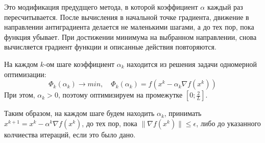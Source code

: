\documentclass[12pt]{article}
\begin{document}
Это модификация предудщего метода, в которой коэффициент $\alpha$ каждый раз пересчитывается. После вычисления в начальной точке градиента, движение в направлении антиградиента делается не маленькими шагами, а до тех пор, пока функция убывает. При достижении минимума на выбранном направлении, снова вычисляется градиент функции и описанные действия повторяются.

На каждом $k$-ом шаге коэффициент $\alpha_k$ находится из решения задачи одномерной оптимизации:
\[ \Phi_k (\alpha_k) \rightarrow min, \quad  \Phi_k (\alpha_k) = f(x^k - \alpha_k \nabla f(x^k)) \]
При этом, $\alpha_k > 0$, поэтому оптимизируем на промежутке $\left[ 0; \frac{2}{L} \right]$.

Таким образом, на каждом шаге будем находить $\alpha_k$, принимать $x^{k+1} = x^{k} - \alpha^{k} \nabla f(x^k)$, до тех пор, пока $\lVert \nabla f(x^k) \rVert \leqslant \epsilon$, либо до указанного колчиества итераций, если это было дано.
\end{document}
